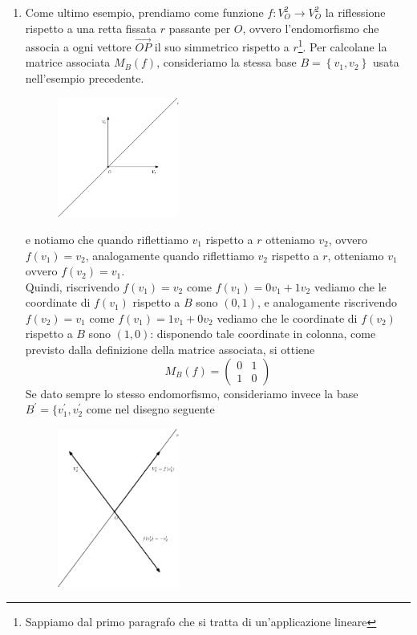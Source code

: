 \begin{esempio}
\begin{enumerate}
\begin{figure}[th]
    \end{figure}   
  \item Come ultimo esempio, prendiamo come funzione $f:V_O^2\to V_O^2$ la riflessione rispetto a una retta
    fissata $r$ passante per $O$, ovvero l'endomorfismo che associa a ogni vettore $\vec{OP}$ il suo simmetrico
    rispetto a $r$\footnote{Sappiamo dal primo paragrafo che si tratta di un'applicazione lineare}. Per calcolane
    la matrice associata $M_B(f)$, consideriamo la stessa base $B=\left\{v_1,v_2\right\}$ usata nell'esempio
    precedente.
    \clearpage
    \begin{figure}[th]
      \centering
        \includegraphics[width=4cm]{img/finiti/imgex4-3-8.eps}
    \end{figure}
    e notiamo che quando riflettiamo $v_1$ rispetto a $r$ otteniamo $v_2$, ovvero $f(v_1)=v_2$, analogamente
    quando riflettiamo $v_2$ rispetto a $r$, otteniamo $v_1$ ovvero $f(v_2)=v_1$.\\
    Quindi, riscrivendo $f(v_1)=v_2$ come $f(v_1)=0v_1+1v_2$ vediamo che le coordinate di $f(v_1)$ rispetto a $B$
    sono $(0,1)$, e analogamente riscrivendo $f(v_2)=v_1$ come $f(v_1)=1v_1+0v_2$ vediamo che le
    coordinate di $f(v_2)$ rispetto a $B$ sono $(1,0)$: disponendo tale coordinate in colonna,
    come previsto dalla definizione della matrice associata, si ottiene
    \begin{equation*}
      M_B(f)=
      \begin{pmatrix}
        0 & 1\\
        1 & 0
      \end{pmatrix}
    \end{equation*}
    Se dato sempre lo stesso endomorfismo, consideriamo invece la base $B^\prime= \{v_1^\prime,
    v^\prime_2$ come nel disegno seguente
    \begin{figure}[th]
      \centering
        \includegraphics[width=4cm]{img/finiti/imgex4-3-9.eps}

\end{figure}
\end{enumerate}
\end{esempio}
